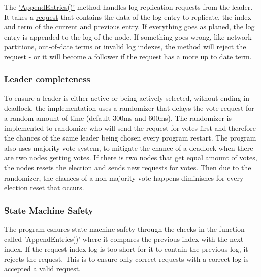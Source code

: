 \documentclass[a4paper,11pt]{article}
\begin{document}
The \href{https://github.com/jmsadair/raft/blob/dev/raft.go#L797}{'AppendEntries()'} method handles log replication requests from the leader. It takes a \href{https://github.com/jmsadair/raft/blob/c7c645603a7a495d858771f1e91f8b5a76cd798d/internal/protobuf/raft.proto#L17}{request} that contains the data of the log entry to replicate, the index and term of the current and previous entry.
If everything goes as planed, the log entry is appended to the log of the node.
If something goes wrong, like network partitions, out-of-date terms or invalid log indexes, the method will reject the request - or it will become a follower if the request has a more up to date term.
\subsubsection*{Leader completeness}
To ensure a leader is either active or being actively selected, without ending in deadlock, the implementation uses a randomizer that delays the vote request for a random amount of time (default 300ms and 600ms).
The randomizer is implemented to randomize who will send the request for votes first and therefore the chances of the same leader being chosen every program restart. The program also uses majority vote system,
to mitigate the chance of a deadlock when there are two nodes getting votes. If there is two nodes that get equal amount of votes, the nodes resets the election and sends new requests for votes.
Then due to the randomizer, the chances of a non-majority vote happens diminishes for every election reset that occurs.

\subsubsection*{State Machine Safety}
The program esnures state machine safety through the checks in the function called \href{https://github.com/jmsadair/raft/blob/dev/raft.go#L858}{'AppendEntries()'} where it compares the previous index with the next index. 
If the request index log is too short for it to contain the previous log, it rejects the request. This is to ensure only correct requests with a correct log is accepted a valid request.
\end{document}
